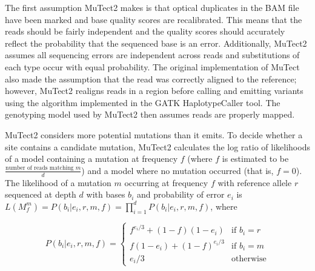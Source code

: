 The first assumption MuTect2 makes is that optical duplicates in the BAM file have been marked and base quality scores are recalibrated. This means that the reads should be fairly independent and the quality scores should accurately reflect the probability that the sequenced base is an error. Additionally, MuTect2 assumes all sequencing errors are independent across reads and substitutions of each type occur with equal probability.
The original implementation of MuTect also made the assumption that the read was correctly aligned to the reference; however, MuTect2 realigns reads in a region before calling and emitting variants using the algorithm implemented in the GATK HaplotypeCaller tool. The genotyping model used by MuTect2 then assumes reads are properly mapped.



MuTect2 considers more potential mutations than it emits. To decide whether a site contains a candidate mutation, MuTect2 calculates the log ratio of likelihoods of a model containing a mutation at frequency $f$ (where $f$ is estimated to be $\frac{\text{number of reads matching }m}{d}$) and a model where no mutation occurred (that is, $f = 0$). The likelihood of a mutation $m$ occurring at frequency $f$ with reference allele $r$ sequenced at depth $d$ with bases $b_i$ and probability of error $e_i$ is $L(M_f^m)=P({b_i}|{e_i},r,m,f)=\prod_{i=1}^{d} P(b_i|e_i,r,m,f)$, where

$$
P(b_i|e_i,r,m,f)=
\begin{cases}
f^{e_i/3}+(1-f)(1-e_i) & \text{if } b_i=r \\
f(1-e_i) + (1-f)^{e_i/3} & \text{if } b_i=m \\
e_i/3 & \text{otherwise}
\end{cases}
$$

